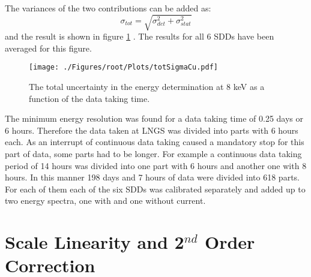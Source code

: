 The variances of the two contributions can be added as:
\begin{equation}
 \sigma_{tot} = \sqrt{\sigma_{det}^{2}+\sigma_{stat}^{2}}
\end{equation} 
and the result is shown in figure \ref{fig:totSigCu}  . The results for all 6 SDDs have been averaged for this figure.
\begin{figure}[h]
 \centering
 \texttt{[image: ./Figures/root/Plots/totSigmaCu.pdf]}
 \caption{The total uncertainty in the energy determination at 8 keV as a function of the data taking time.}
 \label{fig:totSigCu}
\end{figure}
The minimum energy resolution was found for a data taking time of 0.25 days or 6 hours. Therefore the data taken at LNGS was divided into parts with 6 hours each. As an interrupt of continuous data taking caused a mandatory stop for this part of data, some parts had to be longer. For example a continuous data taking period of 14 hours was divided into one part with 6 hours and another one with 8 hours. In this manner 198 days and 7 hours of data were divided into 618 parts. For each of them each of the six SDDs was calibrated separately and added up to two energy spectra, one with and one without current.

\section{Scale Linearity and 2$^{nd}$ Order Correction}
\label{sec:linearity}

